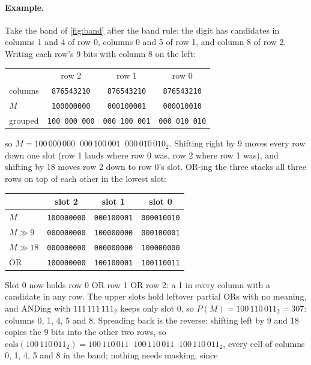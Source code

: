 \paragraph{Example.} Take the band of \cref{fig:band} after the band rule: the digit has candidates in columns 1 and 4
of row 0, columns 0 and 5 of row 1, and column 8 of row 2. Writing each row's 9 bits with column 8 on the left:
\begin{center}
\small
\begin{tabular}{lccc}
 & row 2 & row 1 & row 0 \\
columns & \texttt{876543210} & \texttt{876543210} & \texttt{876543210} \\
\midrule
$M$ & \texttt{100000000} & \texttt{000100001} & \texttt{000010010} \\
grouped & \texttt{100\,000\,000} & \texttt{000\,100\,001} & \texttt{000\,010\,010} \\
\end{tabular}
\end{center}
so $M=100\,000\,000\;\;000\,100\,001\;\;000\,010\,010_2$. Shifting right by 9 moves every row down one slot (row 1 lands where row 0 was, row 2 where row 1
was), and shifting by 18 moves row 2 down to row 0's slot. OR-ing the three stacks all three rows on top of each other in
the lowest slot:
\begin{center}
\small
\begin{tabular}{lccc}
 & slot 2 & slot 1 & slot 0 \\
\midrule
$M$ & \texttt{100000000} & \texttt{000100001} & \texttt{000010010} \\
$M\gg 9$ & \texttt{000000000} & \texttt{100000000} & \texttt{000100001} \\
$M\gg 18$ & \texttt{000000000} & \texttt{000000000} & \texttt{100000000} \\
\midrule
OR & \texttt{100000000} & \texttt{100100001} & \texttt{100110011} \\
\end{tabular}
\end{center}
Slot 0 now holds row 0 OR row 1 OR row 2: a 1 in every column with a candidate in any row. The upper slots hold
leftover partial ORs with no meaning, and ANDing with $111\,111\,111_2$ keeps only slot 0, so $P(M)=100\,110\,011_2=307$: columns 0,
1, 4, 5 and 8. Spreading back is the reverse: shifting left by 9 and 18 copies the 9 bits into the other two rows, so
$\mathrm{cols}(100\,110\,011_2)=100\,110\,011\;\;100\,110\,011\;\;100\,110\,011_2$, every cell of columns 0, 1, 4, 5 and 8 in the band; nothing needs masking, since
